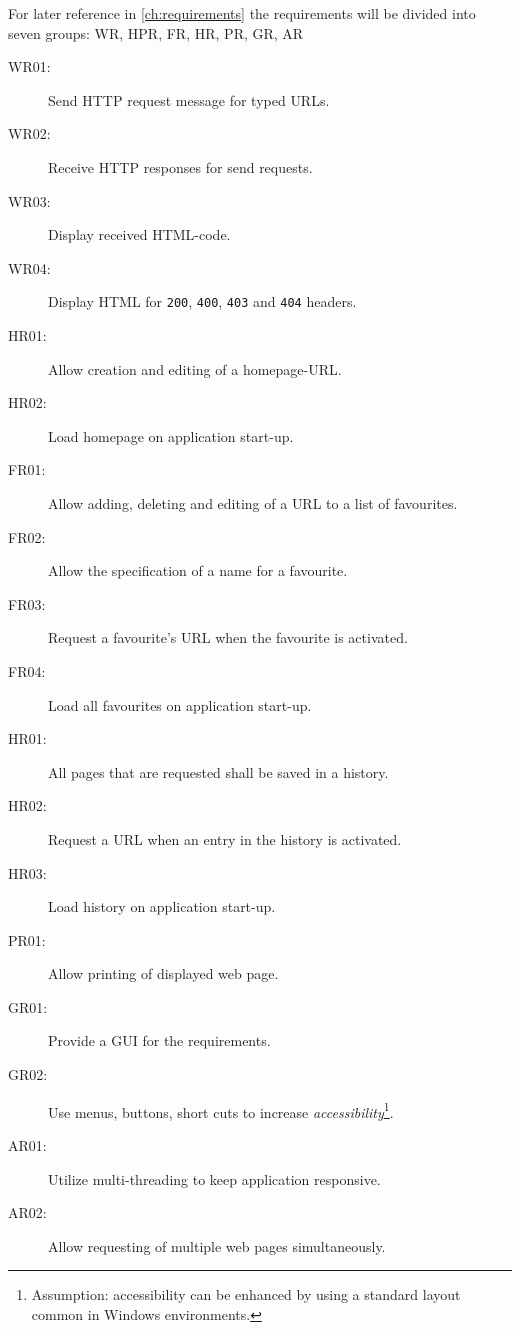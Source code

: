 For later reference in \autoref{ch:requirements} the requirements will be divided into seven groups:
\ac{WR}, \ac{HPR}, \ac{FR}, \ac{HR}, \ac{PR}, \ac{GR}, \ac{AR}

\begin{description}
\item[WR01:] Send \ac{HTTP} request message for typed \ac{URL}s.
\item[WR02:] Receive \ac{HTTP} responses for send requests.
\item[WR03:] Display received \ac{HTML}-code.
\item[WR04:] Display \ac{HTML} for \texttt{200}, \texttt{400}, \texttt{403} and \texttt{404} headers.
\item[HR01:] Allow creation and editing of a homepage-\ac{URL}.
\item[HR02:] Load homepage on application start-up.
\item[FR01:] Allow adding, deleting and editing of a \ac{URL} to a list of favourites.
\item[FR02:] Allow the specification of a name for a favourite.
\item[FR03:] Request a favourite's \ac{URL} when the favourite is activated.
\item[FR04:] Load all favourites on application start-up.
\item[HR01:] All pages that are requested shall be saved in a history.
\item[HR02:] Request a \ac{URL} when an entry in the history is activated.
\item[HR03:] Load history on application start-up.
\item[PR01:] Allow printing of displayed web page.
\item[GR01:] Provide a \ac{GUI} for the requirements.
\item[GR02:] Use menus, buttons, short cuts to increase \textit{accessibility}\footnote{Assumption: accessibility can be enhanced by using a standard layout common in Windows environments.}.
\item[AR01:] Utilize multi-threading to keep application responsive.
\item[AR02:] Allow requesting of multiple web pages simultaneously.
\end{description}